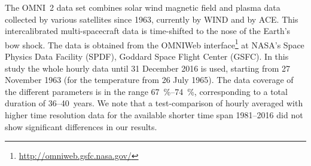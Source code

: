The OMNI~2 data set \citep{King2005} combines solar wind magnetic field and plasma data collected by various satellites since 1963, currently by WIND and by ACE. This intercalibrated multi-spacecraft data is time-shifted to the nose of the Earth’s bow shock. The data is obtained from the OMNIWeb interface\footnote{\url{http://omniweb.gsfc.nasa.gov/}} at NASA's Space Physics Data Facility (SPDF), Goddard Space Flight Center (GSFC).
%
In this study the whole hourly data until 31 December 2016 is used, starting from 27 November 1963 (for the temperature from 26 July 1965). The data coverage of the different parameters is in the range \SIrange{67}{74}{\percent},  corresponding to a total duration of 36--40~years.
%
We note that a test-comparison of hourly averaged with higher time resolution data for the available shorter time span 1981--2016 did not show significant differences in our results.

